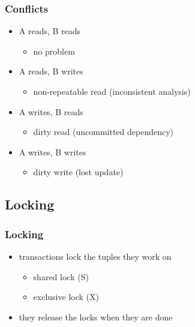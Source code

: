 \documentclass[dvipsnames]{beamer}
\theoremstyle{plain}
\begin{document}
\begin{frame}
  \frametitle{Conflicts}

  \begin{itemize}
    \item A reads, B reads
    \begin{itemize}
      \item no problem
    \end{itemize}

    \pause
    \item A reads, B writes
    \begin{itemize}
      \item non-repeatable read (inconsistent analysis)
    \end{itemize}

    \pause
    \item A writes, B reads
    \begin{itemize}
      \item dirty read (uncommitted dependency)
    \end{itemize}

    \pause
    \item A writes, B writes
    \begin{itemize}
      \item dirty write (lost update)
    \end{itemize}
  \end{itemize}
\end{frame}

\subsection{Locking}

\begin{frame}
  \frametitle{Locking}

  \begin{itemize}
    \item transactions lock the tuples they work on
    \begin{itemize}
      \item shared lock (S)
      \item exclusive lock (X)
    \end{itemize}

    \item they release the locks when they are done
  \end{itemize}
\end{frame}
\end{document}
